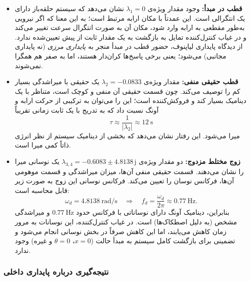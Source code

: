 \documentclass[a4paper,12pt]{article}
\begin{document}
\begin{itemize}
    \item \textbf{قطب در مبدأ:}
          وجود مقدار ویژه‌ی
          \(
          \lambda_1 = 0
          \)
          نشان می‌دهد که سیستم حلقه‌باز دارای یک  انتگرالی است. این  عمدتاً با مکان ارابه مرتبط است؛ به این معنا که اگر نیرویی به‌طور مقطعی به ارابه وارد شود، مکان آن به صورت انتگرال سرعت تغییر می‌کند و در غیاب کنترل‌کننده تمایل به بازگشت به یک مقدار ثابت از پیش تعیین‌شده ندارد. از دیدگاه پایداری لیاپنوف، حضور قطب در مبدأ منجر به \emph{پایداری مرزی} (نه پایداری مجانبی) می‌شود؛ یعنی برخی پاسخ‌ها کران‌دار هستند، اما به صفر هم همگرا نمی‌شوند.

    \item \textbf{قطب حقیقی منفی:}
          مقدار ویژه‌ی
          \(
          \lambda_2 = -0.0833
          \)
          یک  حقیقی با میراشدگی بسیار کم را توصیف می‌کند. چون قسمت حقیقی آن منفی و کوچک است، متناظر با یک دینامیک بسیار کند و فروکش‌کننده است؛ این  را می‌توان به ترکیبی از حرکت ارابه و آونگ نسبت داد که به تدریج با یک ثابت زمانی تقریباً
          \[
              \tau \approx \frac{1}{|\lambda_2|} \approx 12~\mathrm{s}
          \]
          میرا می‌شود. این رفتار نشان می‌دهد که بخشی از دینامیک سیستم از نظر انرژی ذاتاً کمی میرا است.

    \item \textbf{زوج مختلط مزدوج:}
          دو مقدار ویژه‌ی
          \(
          \lambda_{3,4} = -0.6083 \pm 4.8138\,\mathrm{j}
          \)
          یک  نوسانی میرا را نشان می‌دهند. قسمت حقیقی منفی آن‌ها، میزان میراشدگی و قسمت موهومی آن‌ها، فرکانس نوسان را تعیین می‌کند. فرکانس نوسانی این زوج به صورت زیر قابل محاسبه است:
          \begin{equation}
              \omega_d = 4.8138~\mathrm{rad/s}
              \quad\Rightarrow\quad
              f_d = \frac{\omega_d}{2\pi} \approx 0.77~\mathrm{Hz}.
          \end{equation}
          بنابراین، دینامیک آونگ دارای نوساناتی با فرکانس حدود
          $0.77~\mathrm{Hz}$
          و میراشدگی مشخص (به دلیل اصطکاک‌ها) است. در غیاب کنترل‌کننده، این نوسانات به مرور زمان کاهش می‌یابند، اما این کاهش صرفاً در بخش نوسانی انجام می‌شود و تضمینی برای بازگشت کامل سیستم به مبدأ حالت ($x=0$، $\theta=0$ و غیره) وجود ندارد.
\end{itemize}

\subsubsection*{نتیجه‌گیری درباره پایداری داخلی}
\end{document}

